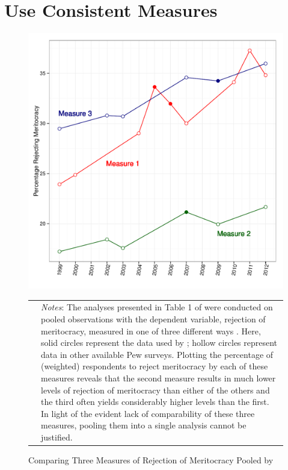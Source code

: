 
\section{Use Consistent Measures}

\begin{figure}[htbp] 
  \caption{Comparing Three Measures of Rejection of Meritocracy Pooled by \citet{Newman2015}}
  \label{F:three_measures}
  \begin{center}
    \includegraphics[width=5.25in]{../figures/04_three_measures_dv.pdf}
  \end{center}
  \begin{footnotesize}
  \begin{tabular}{p{.1in} p{5.1in}}
  & \emph{Notes}: The analyses presented in Table 1 of \citet[333]{Newman2015} were conducted on pooled observations with the dependent variable, rejection of meritocracy, measured in one of three different ways \citep[see][331]{Newman2015}.  Here, solid circles represent the data used by \citet{Newman2015}; hollow circles represent data in other available Pew surveys.  Plotting the percentage of (weighted) respondents to reject meritocracy by each of these measures reveals that the second measure results in much lower levels of rejection of meritocracy than either of the others and the third often yields considerably higher levels than the first.  In light of the evident lack of comparability of these three measures, pooling them into a single analysis cannot be justified.
  \end{tabular}
  \end{footnotesize}
\end{figure}

